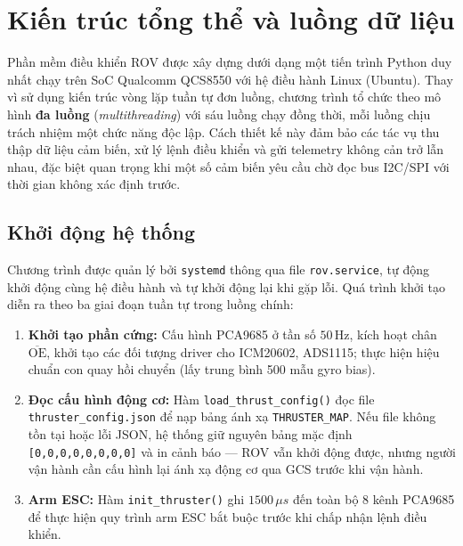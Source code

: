 \documentclass[../DoAn.tex]{subfiles}
\begin{document}
\section{Kiến trúc tổng thể và luồng dữ liệu}

Phần mềm điều khiển ROV được xây dựng dưới dạng một tiến trình Python
duy nhất chạy trên SoC Qualcomm QCS8550 với hệ điều hành Linux
(Ubuntu). Thay vì sử dụng kiến trúc vòng lặp tuần tự đơn luồng,
chương trình tổ chức theo mô hình \textbf{đa luồng} (\textit{multithreading})
với sáu luồng chạy đồng thời, mỗi luồng chịu trách nhiệm một chức năng
độc lập. Cách thiết kế này đảm bảo các tác vụ thu thập dữ liệu cảm
biến, xử lý lệnh điều khiển và gửi telemetry không cản trở lẫn nhau,
đặc biệt quan trọng khi một số cảm biến yêu cầu chờ đọc bus I2C/SPI
với thời gian không xác định trước.

\subsection{Khởi động hệ thống}

Chương trình được quản lý bởi \texttt{systemd} thông qua file
\texttt{rov.service}, tự động khởi động cùng hệ điều hành và tự khởi
động lại khi gặp lỗi. Quá trình khởi tạo diễn ra theo ba giai đoạn
tuần tự trong luồng chính:

\begin{enumerate}
    \item \textbf{Khởi tạo phần cứng:} Cấu hình PCA9685 ở tần số
    $50\,\text{Hz}$, kích hoạt chân $\overline{\text{OE}}$, khởi tạo
    các đối tượng driver cho ICM20602, ADS1115; thực hiện hiệu chuẩn
    con quay hồi chuyển (lấy trung bình 500 mẫu gyro bias).

    \item \textbf{Đọc cấu hình động cơ:} Hàm \texttt{load\_thrust\_config()}
    đọc file \\ \texttt{thruster\_config.json} để nạp bảng ánh xạ
    \texttt{THRUSTER\_MAP}. Nếu file không tồn tại hoặc lỗi JSON, hệ
    thống giữ nguyên bảng mặc định \texttt{[0,0,0,0,0,0,0,0]} và in
    cảnh báo --- ROV vẫn khởi động được, nhưng người vận hành cần cấu
    hình lại ánh xạ động cơ qua GCS trước khi vận hành.

    \item \textbf{Arm ESC:} Hàm \texttt{init\_thruster()} ghi
    $1500\,\mu s$ đến toàn bộ 8 kênh PCA9685 để thực hiện quy trình
    arm ESC bắt buộc trước khi chấp nhận lệnh điều khiển.
\end{enumerate}
\end{document}
